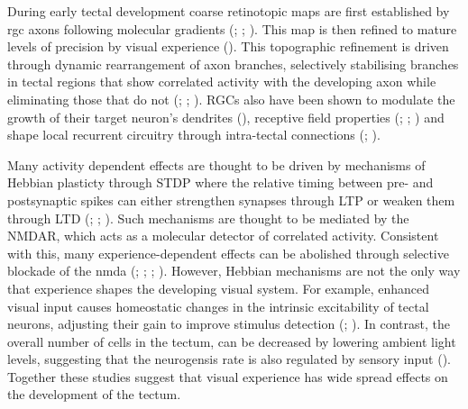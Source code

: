 During early tectal development coarse retinotopic maps are first established by \gls{rgc} axons following molecular gradients (\cite{Higenell2012ExpressionLaevis}; \cite{Liu2004SwitchingDevelopment}; \cite{Kita2015TopographicZebrafish}). This map is then refined to mature levels of precision by visual experience (\cite{Ruthazer2004InsightsPerspective}). This topographic refinement is driven through dynamic rearrangement of axon branches, selectively stabilising branches in tectal regions that show correlated activity with the developing axon while eliminating those that do not (\cite{Ruthazer2003ControlVivo}; \cite{Munz2014RapidStimulation}; \cite{Ruthazer2004InsightsPerspective}). RGCs also have been shown to modulate the growth of their target neuron's dendrites (\cite{Sin2002DendriteGTPases}), receptive field properties (\cite{Tao2005Activity-dependentFields}; \cite{Dong2012AFields}; \cite{Engert2002MovingNeurons}) and shape local recurrent circuitry through intra-tectal connections (\cite{Pratt2008DevelopmentTectum}; \cite{Xu2011VisualSystem}). 

Many activity dependent effects are thought to be driven by mechanisms of Hebbian plasticty through STDP where the relative timing between pre- and postsynaptic spikes can either strengthen synapses through LTP or weaken them through LTD (\cite{Mu2006SpikeSystem}; \cite{Zhang1998ASynapses}; \cite{Richards2010InLaevis}). Such mechanisms are thought to be mediated by the NMDAR, which acts as a molecular detector of correlated activity. Consistent  with this, many experience-dependent effects can be abolished through selective blockade of the \gls{nmda}  (\cite{Ruthazer2003ControlVivo}; \cite{Engert2002MovingNeurons}; \cite{Sin2002DendriteGTPases}; \cite{Kutsarova2017RulesBrain}). However, Hebbian mechanisms are not the only way that experience shapes the developing visual system. For example, enhanced visual input causes homeostatic changes in the intrinsic excitability of tectal neurons, adjusting their gain to improve stimulus detection (\cite{Aizenman2003VisuallyVivo}; \cite{Pratt2007HomeostaticCircuit}). In contrast, the overall number of cells in the tectum, can be decreased by lowering ambient light levels, suggesting that the neurogensis rate is also regulated by sensory input (\cite{Hall2018VisualTectum}). Together these studies suggest that visual experience has wide spread effects on the development of the tectum.

